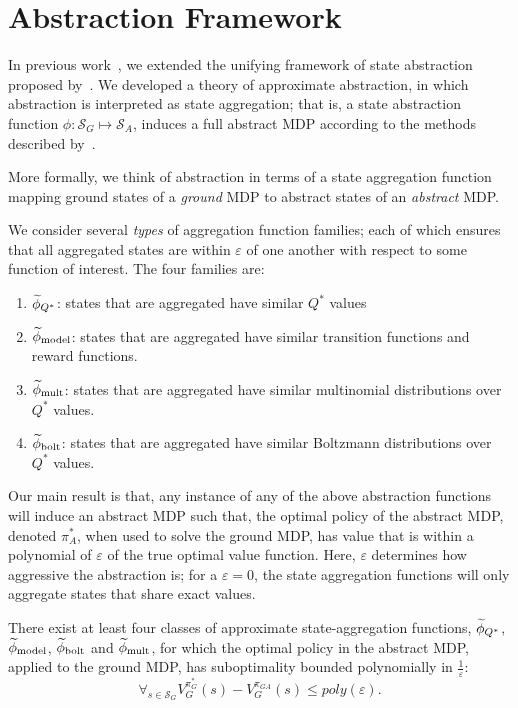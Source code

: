 \section{Abstraction Framework}

In previous work~\cite{abelhershko2016approx}, we extended the unifying framework of state abstraction proposed by~\cite{li2006towards}. We developed a theory of approximate abstraction, in which abstraction is interpreted as state aggregation; that is, a state abstraction function $\phi : \mathcal{S}_G \mapsto \mathcal{S}_A$, induces a full abstract \ac{MDP} according to the methods described by~\cite{li2006towards}.

More formally, we think of abstraction in terms of a state aggregation function mapping ground states of a {\it ground} MDP to abstract states of an {\it abstract} MDP.

We consider several {\it types} of aggregation function families; each of which ensures that all aggregated states are within $\varepsilon$ of one another with respect to some function of interest. The four families are:
\begin{enumerate}
\item $\widetilde \phi_{Q^*}$: states that are aggregated have similar $Q^*$ values
\item $\widetilde \phi_{\text{model}}$: states that are aggregated have similar transition functions and reward functions.
\item $\widetilde \phi_{\text{mult}}$: states that are aggregated have similar multinomial distributions over $Q^*$ values.
\item $\widetilde \phi_{\text{bolt}}$: states that are aggregated have similar Boltzmann distributions over $Q^*$ values.
\end{enumerate}

Our main result is that, any instance of any of the above abstraction functions will induce an abstract \ac{MDP} such that, the optimal policy of the abstract MDP, denoted $\pi_A^*$, when used to solve the ground MDP, has value that is within a polynomial of $\varepsilon$ of the true optimal value function. Here, $\varepsilon$ determines how aggressive the abstraction is; for a $\varepsilon=0$, the state aggregation functions will only aggregate states that share exact values.

\begin{thm}
There exist at least four classes of approximate state-aggregation functions, $\widetilde \phi_{Q^*}$, $\widetilde \phi_{\text{model}}$, $\widetilde \phi_{\text{bolt}}$ and $\widetilde \phi_{\text{mult}}$, for which the optimal policy in the abstract \ac{MDP}, applied to the ground \ac{MDP}, has suboptimality bounded polynomially in $\frac{1}{\varepsilon}$:
\begin{equation}
\forall_{s \in \mathcal{S}_G} V_G^{\pi_G^*}(s) - V_G^{\pi_{GA}}(s) \leq poly \left (\varepsilon \right).
\end{equation}
\end{thm}

